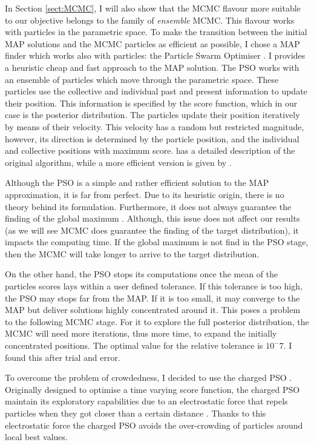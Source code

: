 In Section \ref{sect:MCMC}, I will also show that the MCMC flavour more suitable to our objective belongs to the family of \emph{ensemble} MCMC. This flavour works with particles in the parametric space. To make the transition between the initial MAP solutions and the  MCMC particles as efficient as possible, I chose a MAP finder which works also with particles: the Particle Swarm Optimiser \cite[PSO,][]{Kennedy1995}. I provides a heuristic cheap and fast approach to the MAP solution. The PSO works with an ensemble of particles which move through the parametric space. These particles use the collective and individual past and present information to update their position. This information is specified by the score function, which in our case is the posterior distribution. The particles update their position iteratively by means of their velocity. This velocity has a random but restricted magnitude, however, its direction is determined by the particle position, and the individual and collective positions with maximum score. \citet{Kennedy1995} has a detailed description of the original algorithm, while a more efficient version is given by \citep{Clerc2002}.

Although the PSO is a simple and rather efficient solution to the MAP approximation, it is far from perfect. Due to its heuristic origin, there is no theory behind its formulation. Furthermore, it does not always guarantee the finding of the global maximum \cite[for a convergence guaranteed version see][]{Patel2013}. Although,  this issue does not affect our results (as we will see MCMC does guarantee the finding of the target distribution), it impacts the computing time. If the global maximum is not find in the PSO stage, then the MCMC will take longer to arrive to the target distribution. 

On the other hand, the PSO stops its computations once the mean of the particles scores lays within a user defined tolerance. If this tolerance is too high, the PSO may stops far from the MAP. If it is too small, it may converge to the MAP but deliver solutions highly concentrated around it. This poses a problem to the following MCMC stage. For it to explore the full posterior distribution, the MCMC will need more iterations, thus more time, to expand the initially concentrated positions. The optimal value for the relative tolerance is $10^-7$. I found this after trial and error.  

To overcome the problem of crowdedness, I decided to use the charged PSO \citep{Blackwell2002}. Originally designed to optimise a time varying score function, the charged PSO maintain its exploratory capabilities due to an electrostatic force that repels particles when they got closer than a certain distance \citep{Blackwell2002}. Thanks to this electrostatic force the charged PSO avoids the over-crowding of particles around local best values.

